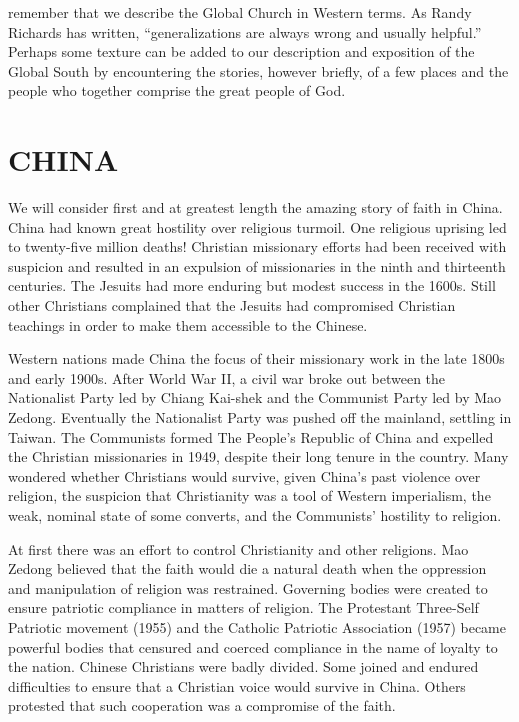 
 remember that we describe the Global Church in Western terms. As Randy
Richards has written, “generalizations are always wrong and usually helpful.” Perhaps some texture
can be added to our description and exposition of the Global South by encountering the stories,
however briefly, of a few places and the people who together comprise the great people of God.

\section{CHINA}

We will consider first and at greatest length the amazing story of faith in China. China had known
great hostility over religious turmoil. One religious uprising led to twenty-five million deaths!
Christian missionary efforts had been received with suspicion and resulted in an expulsion of
missionaries in the ninth and thirteenth centuries. The Jesuits had more enduring but modest success
in the 1600s. Still other Christians complained that the Jesuits had compromised Christian teachings
in order to make them accessible to the Chinese.

Western nations made China the focus of their missionary work in the late 1800s and early 1900s.
After World War II, a civil war broke out between the Nationalist Party led by Chiang Kai-shek and
the Communist Party led by Mao Zedong. Eventually the Nationalist Party was pushed off the mainland,
settling in Taiwan. The Communists formed The People’s Republic of China and expelled the Christian
missionaries in 1949, despite their long tenure in the country. Many wondered whether Christians
would survive, given China’s past violence over religion, the suspicion that Christianity was a tool
of Western imperialism, the weak, nominal state of some converts, and the Communists’ hostility to
religion.

At first there was an effort to control Christianity and other religions. Mao Zedong believed that
the faith would die a natural death when the oppression and manipulation of religion was restrained.
Governing bodies were created to ensure patriotic compliance in matters of religion. The Protestant
Three-Self Patriotic movement (1955) and the Catholic Patriotic Association (1957) became powerful
bodies that censured and coerced compliance in the name of loyalty to the nation. Chinese Christians
were badly divided. Some joined and endured difficulties to ensure that a Christian voice would
survive in China. Others protested that such cooperation was a compromise of the faith.

